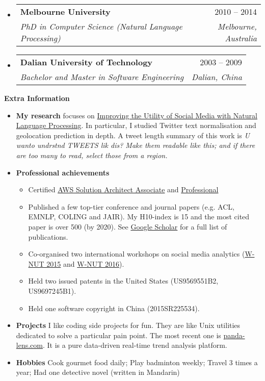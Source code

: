 \documentclass[letterpaper,12pt]{article}[leftmargin=*]
\makeatletter
\def \entryspacing {-0pt}
\renewcommand{\section}[2]{\vspace{5pt}
  \colorbox{secondary}{\color{white}\raggedbottom\normalsize\textbf{{#1}{\hspace{7pt}#2}}}
}
\newcommand{\resumeEntryStart}{\begin{itemize}[leftmargin=2.5mm]}
\newcommand{\resumeEntryEnd}{\end{itemize}\vspace{\entryspacing}}
\newcommand{\resumeItemListStart}{\begin{itemize}[leftmargin=4.5mm]}
\newcommand{\resumeItemListEnd}{\end{itemize}}
\newcommand{\resumeItem}[1]{
  \item\small{
    {#1 \vspace{-2pt}}
  }
}
\newcommand{\resumeEntryTSDL}[4]{
  \vspace{-1pt}\item[]
    \begin{tabularx}{0.97\textwidth}{X@{\hspace{60pt}}r}
      \textbf{\color{primary}#1} & {\firabook\color{accent}\small#2} \\
      \textit{\color{accent}\small#3} & \textit{\color{accent}\small#4} \\
    \end{tabularx}\vspace{-6pt}
}
\newcommand{\resumeEntryS}[2]{
  \item[]\small{
    \textbf{\color{primary}#1 }{ #2 \vspace{-6pt}}
  }
}
\makeatother
\begin{document}
  \resumeEntryStart
    \resumeEntryTSDL
      {Melbourne University}{2010 -- 2014}
      {PhD in Computer Science (Natural Language Processing)}{Melbourne, Australia}
    \resumeEntryTSDL
      {Dalian University of Technology}{2003 -- 2009}
      {Bachelor and Master in Software Engineering}{Dalian, China}
  \resumeEntryEnd

\section{\faGears}{Extra Information}

 \resumeEntryStart
  \resumeEntryS{My research}{focuses on \href{https://minerva-access.unimelb.edu.au/bitstream/handle/11343/41029/thesis.pdf?sequence=1}{Improving the Utility of Social Media with Natural Language Processing}. In particular, I studied Twitter text normalisation and geolocation prediction in depth. A tweet length summary of this work is \textit{U wanto undrstnd TWEETS lik dis? Make them readable like this; and if there are too many to read, select those from a region.}}
\resumeEntryS{Professional achievements}{
    \resumeItemListStart
      \resumeItem {Certified \href{https://www.youracclaim.com/badges/c7ac42bd-fe9a-4f13-83b3-80cea3a8cc57/public_url}{AWS Solution Architect Associate} and \href{https://www.youracclaim.com/badges/f7d5a6a9-caaf-472c-b703-207ae1046147/public_url}{Professional}}
      \resumeItem {Published a few top-tier conference and journal papers (e.g. ACL, EMNLP, COLING and JAIR). My H10-index is 15 and the most cited paper is over 500 (by 2020). See \href{https://scholar.google.com/citations?hl=en&user=ZRr4vn8AAAAJ}{Google Scholar} for a full list of publications.}
      \resumeItem {Co-organised two international workshops on social media analytics (\href{https://noisy-text.github.io/2015/}{W-NUT 2015} and \href{https://noisy-text.github.io/2015/}{W-NUT 2016}).}
      \resumeItem {Held two issued patents in the United States (US9569551B2, US9697245B1).}
      \resumeItem {Held one software copyright in China (2015SR225534).}
    \resumeItemListEnd}

  \resumeEntryS{Projects} {I like coding side projects for fun. They are like Unix utilities dedicated to solve a particular pain point. The most recent one is \href{https://panda-lens.com/}{panda-lens.com}. It is a pure data-driven real-time trend analysis platform.}
  \resumeEntryS{Hobbies} {Cook gourmet food daily; Play badminton weekly; Travel 3 times a year; Had one detective novel (written in Mandarin)}
 \resumeEntryEnd
\end{document}
